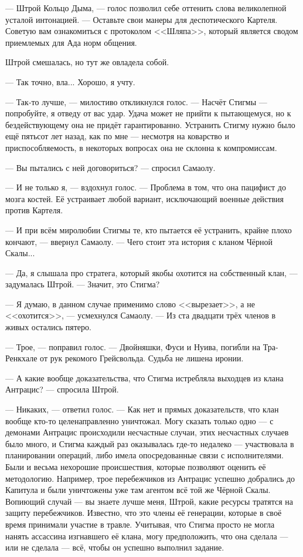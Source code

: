 --- Штрой Кольцо Дыма, --- голос позволил себе оттенить слова великолепной усталой интонацией.
--- Оставьте свои манеры для деспотического Картеля.
Советую вам ознакомиться с протоколом <<Шляпа>>, который является сводом приемлемых для Ада норм общения.

Штрой смешалась, но тут же овладела собой.

--- Так точно, вла...
Хорошо, я учту.

--- Так-то лучше, --- милостиво откликнулся голос.
--- Насчёт Стигмы --- попробуйте, я отведу от вас удар.
Удача может не прийти к пытающемуся, но к бездействующему она не придёт гарантированно.
Устранить Стигму нужно было ещё пятьсот лет назад, как по мне --- несмотря на коварство и приспособляемость, в некоторых вопросах она не склонна к компромиссам.

--- Вы пытались с ней договориться? --- спросил Самаолу.

--- И не только я, --- вздохнул голос.
--- Проблема в том, что она пацифист до мозга костей.
Её устраивает любой вариант, исключающий военные действия против Картеля.

--- И при всём миролюбии Стигмы те, кто пытается её устранить, крайне плохо кончают, --- ввернул Самаолу.
--- Чего стоит эта история с кланом Чёрной Скалы...

--- Да, я слышала про стратега, который якобы охотится на собственный клан, --- задумалась Штрой.
--- Значит, это Стигма?

--- Я думаю, в данном случае применимо слово <<вырезает>>, а не <<охотится>>, --- усмехнулся Самаолу.
--- Из ста двадцати трёх членов в живых остались пятеро.

--- Трое, --- поправил голос.
--- Двойняшки, Фуси и Нуива, погибли на Тра-Ренкхале от рук рекомого Грейсвольда.
Судьба не лишена иронии.

--- А какие вообще доказательства, что Стигма истребляла выходцев из клана Антрацис? --- спросила Штрой.

--- Никаких, --- ответил голос.
--- Как нет и прямых доказательств, что клан вообще кто-то целенаправленно уничтожал.
Могу сказать только одно --- с демонами Антрацис происходили несчастные случаи, этих несчастных случаев было много, и Стигма каждый раз оказывалась где-то недалеко --- участвовала в планировании операций, либо имела опосредованные связи с исполнителями.
Были и весьма нехорошие происшествия, которые позволяют оценить её методологию.
Например, трое перебежчиков из Антрацис успешно добрались до Капитула и были уничтожены уже там агентом всё той же Чёрной Скалы.
Вопиющий случай --- вы знаете лучше меня, Штрой, какие ресурсы тратятся на защиту перебежчиков.
Известно, что это члены её генерации, которые в своё время принимали участие в травле.
Учитывая, что Стигма просто не могла нанять ассассина изгнавшего её клана, могу предположить, что она сделала --- или не сделала --- всё, чтобы он успешно выполнил задание.

